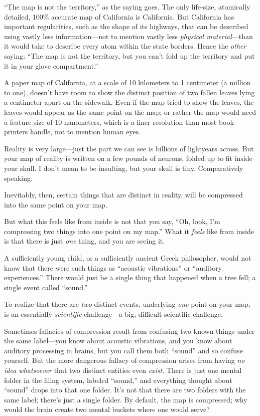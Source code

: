 \myendsectiontext


{
 ``The map is not the
territory,'' as the saying goes. The only life-size,
atomically detailed, 100\% accurate map of California is California.
But California has important regularities, such as the shape of its
highways, that can be described using vastly less information---not to
mention vastly less \textit{physical material}{}---than it would take
to describe every atom within the state borders. Hence the
\textit{other} saying: ``The map is not the territory,
but you can't fold up the territory and put it in your
glove compartment.'' }

{
 A paper map of California, at a scale of 10 kilometers to 1
centimeter (a million to one), doesn't have room to
show the distinct position of two fallen leaves lying a centimeter
apart on the sidewalk. Even if the map tried to show the leaves, the
leaves would appear as the same point on the map; or rather the map
would need a feature size of 10 nanometers, which is a finer resolution
than most book printers handle, not to mention human eyes.}

{
 Reality is very large---just the part we can see is billions of
lightyears across. But your map of reality is written on a few pounds
of neurons, folded up to fit inside your skull. I don't
mean to be insulting, but your skull is tiny. Comparatively speaking.}

{
 Inevitably, then, certain things that are distinct in reality,
will be compressed into the same point on your map.}

{
 But what this feels like from inside is not that you say,
``Oh, look, I'm compressing two things
into one point on my map.'' What it \textit{feels}
like from inside is that there is just \textit{one} thing, and you are
seeing it.}

{
 A sufficiently young child, or a sufficiently ancient Greek
philosopher, would not know that there were such things as
``acoustic vibrations'' or
``auditory experiences.'' There
would just be a single thing that happened when a tree fell; a single
event called ``sound.''}

{
 To realize that there are \textit{two} distinct events, underlying
\textit{one} point on your map, is an essentially \textit{scientific}
challenge---a big, difficult scientific challenge.}

{
 Sometimes fallacies of compression result from confusing two known
things under the same label---you know about acoustic vibrations, and
you know about auditory processing in brains, but you call them both
``sound'' and so confuse yourself.
But the more dangerous fallacy of compression arises from having
\textit{no idea whatsoever} that two distinct entities even
\textit{exist}. There is just one mental folder in the filing system,
labeled ``sound,'' and everything
thought about ``sound'' drops into
that one folder. It's not that there are two folders
with the same label; there's just a single folder. By
default, the map is compressed; why would the brain create two mental
buckets where one would serve?}

